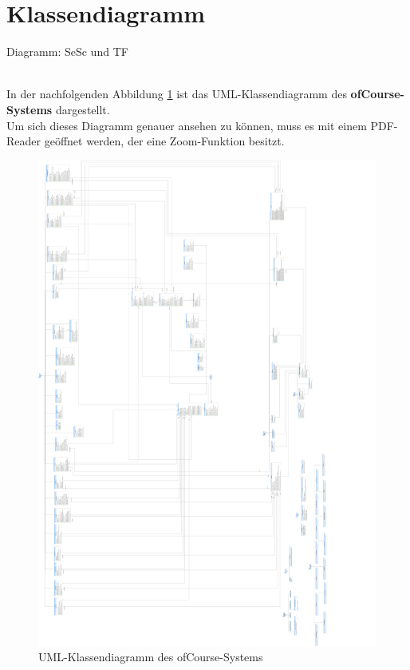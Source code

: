 	
	\section{Klassendiagramm}
	\begin{tiny}
		Diagramm: SeSc und TF\\
	\end{tiny}\\
	In der nachfolgenden Abbildung \ref{fig:classdiag} ist das UML-Klassendiagramm des \textbf{ofCourse-Systems} dargestellt.\\
	Um sich dieses Diagramm genauer ansehen zu können, muss es mit einem PDF-Reader
	geöffnet werden, der eine Zoom-Funktion besitzt.
	
	\begin{figure}[h]
		\centering
		\includegraphics[width=1\linewidth]{Grafiken/Klassendiagramm}
		\caption{UML-Klassendiagramm des ofCourse-Systems}
		\label{fig:classdiag}
	\end{figure}
	
